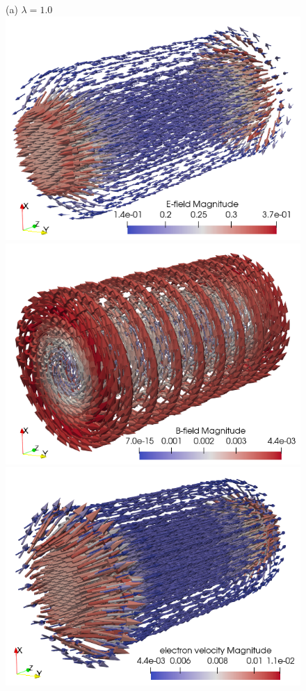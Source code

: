 \documentclass{article}
\begin{document}
\begin{figure}
    (a) $\lambda = 1.0$ \\
    \includegraphics[scale=0.35]{E_lambda_1e-2.png}
    \includegraphics[scale=0.35]{B_lambda_1e-2.png}
    \includegraphics[scale=0.35]{ue_lambda_1e-2.png} \\

\end{figure}
\end{document}
